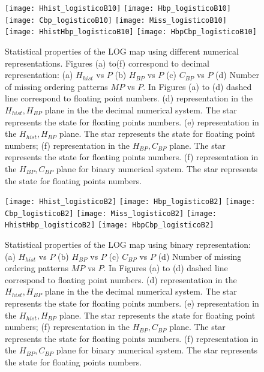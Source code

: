 \begin{figure}
\texttt{[image: Hhist\_logisticoB10]}
\texttt{[image: Hbp\_logisticoB10]}
\texttt{[image: Cbp\_logisticoB10]}
\texttt{[image: Miss\_logisticoB10]}
\texttt{[image: HhistHbp\_logisticoB10]}
\texttt{[image: HbpCbp\_logisticoB10]}
\caption{Statistical properties of the LOG map using different numerical representations. Figures (a) to(f) correspond to decimal representation: (a) $H_{hist}$ vs $P$ (b) $H_{BP}$ vs $P$ (c) $C_{BP}$ vs $P$ (d) Number of missing ordering patterns $MP$ vs $P$. In Figures (a) to (d) dashed line correspond to floating point numbers. (d) representation in the $H_{hist},H_{BP}$ plane in the the decimal numerical system.  The star represents the state for floating points numbers. (e) representation in the $H_{hist},H_{BP}$ plane. The star represents the state for floating point numbers; (f) representation in the $H_{BP},C_{BP}$ plane.  The star represents the state for floating points numbers. (f) representation in the $H_{BP},C_{BP}$ plane for binary numerical system.  The star represents the state for floating points numbers. } \label{fig:LOGdecimal}
\end{figure}
\begin{figure}
\texttt{[image: Hhist\_logisticoB2]}
\texttt{[image: Hbp\_logisticoB2]}
\texttt{[image: Cbp\_logisticoB2]}
\texttt{[image: Miss\_logisticoB2]}
\texttt{[image: HhistHbp\_logisticoB2]}
\texttt{[image: HbpCbp\_logisticoB2]}
\caption{Statistical properties of the LOG map using binary representation: (a) $H_{hist}$ vs $P$ (b) $H_{BP}$ vs $P$ (c) $C_{BP}$ vs $P$ (d) Number of missing ordering patterns $MP$ vs $P$. In Figures (a) to (d) dashed line correspond to floating point numbers. (d) representation in the $H_{hist},H_{BP}$ plane in the the decimal numerical system.  The star represents the state for floating points numbers. (e) representation in the $H_{hist},H_{BP}$ plane. The star represents the state for floating point numbers; (f) representation in the $H_{BP},C_{BP}$ plane.  The star represents the state for floating points numbers. (f) representation in the $H_{BP},C_{BP}$ plane for binary numerical system.  The star represents the state for floating points numbers. } \label{fig:LOGbinario}
\end{figure}

